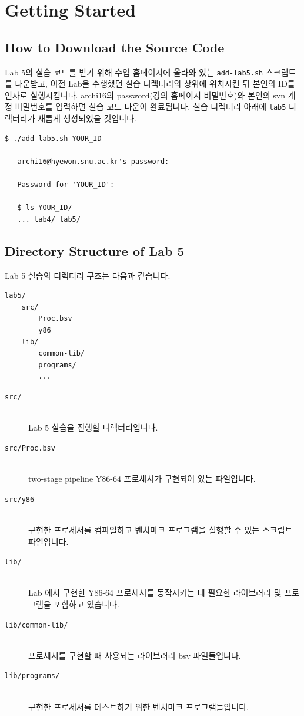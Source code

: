 \documentclass{article}
\begin{document}
\section{Getting Started}
\subsection{How to Download the Source Code}
Lab 5의 실습 코드를 받기 위해 수업 홈페이지에 올라와 있는 \texttt{add-lab5.sh} 스크립트를 다운받고,
이전 Lab을 수행했던 실습 디렉터리의 상위에 위치시킨 뒤 본인의 ID를 인자로 실행시킵니다.
archi16의 password(강의 홈페이지 비밀번호)와 본인의 svn 계정 비밀번호를 입력하면 실습 코드 다운이 완료됩니다.
실습 디렉터리 아래에 \texttt{lab5} 디렉터리가 새롭게 생성되었을 것입니다.

\begin{Verbatim}[frame=single]
   $ ./add-lab5.sh YOUR_ID

   archi16@hyewon.snu.ac.kr's password:

   Password for 'YOUR_ID':

   $ ls YOUR_ID/
   ... lab4/ lab5/
\end{Verbatim}


\subsection{Directory Structure of Lab 5}
Lab 5 실습의 디렉터리 구조는 다음과 같습니다.

\begin{Verbatim}[frame=single]
lab5/
    src/
        Proc.bsv
        y86
    lib/
        common-lib/
        programs/
        ...
\end{Verbatim}

\begin{description}
\item [\texttt{src/}]\hfill \ \\
	Lab 5 실습을 진행할 디렉터리입니다.

\item [\texttt{src/Proc.bsv}]\hfill \ \\
	two-stage pipeline Y86-64 프로세서가 구현되어 있는 파일입니다.

\item [\texttt{src/y86}]\hfill \ \\
	구현한 프로세서를 컴파일하고 벤치마크 프로그램을 실행할 수 있는 스크립트 파일입니다.

\item [\texttt{lib/}]\hfill \ \\
	Lab 에서 구현한 Y86-64 프로세서를 동작시키는 데 필요한 라이브러리 및 프로그램을 포함하고 있습니다.

\item [\texttt{lib/common-lib/}]\hfill \ \\
	프로세서를 구현할 때 사용되는 라이브러리 bsv 파일들입니다.

\item [\texttt{lib/programs/}]\hfill \ \\
	구현한 프로세서를 테스트하기 위한 벤치마크 프로그램들입니다.

\end{description}
\end{document}
